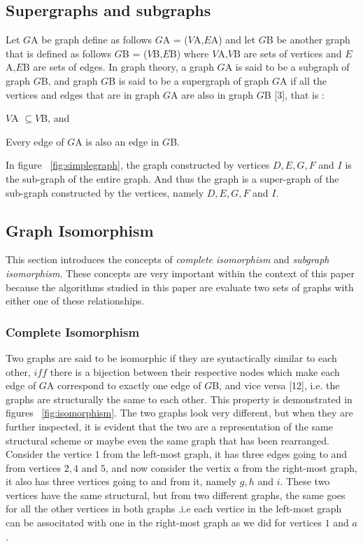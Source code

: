 \subsection{Supergraphs and subgraphs}
Let $G${\tiny A} be graph define as follows $G${\tiny A} = ($V${\tiny A},$E${\tiny A}) and let $G${\tiny B} be another graph that is defined as 
follows $G${\tiny B} = ($V${\tiny B},$E${\tiny B}) where $V${\tiny A},$V${\tiny B} are sets of vertices and $E${\tiny A},$E${\tiny B} are sets of edges.
In graph theory, a graph $G${\tiny A} is said to be a subgraph of graph $G${\tiny B}, and graph $G${\tiny B} is said to be a supergraph of graph 
$G${\tiny A} if all the vertices and edges that are in graph $G${\tiny A} are also in graph $G${\tiny B} [3], that is :

\begin{myEnumerate}
  \item $V${\tiny A} $ \subseteq V${\tiny B}, and
  \item Every edge of $G${\tiny A} is also an edge in $G${\tiny B}.
\end{myEnumerate}

In figure  ~\ref{fig:simplegraph}, the graph constructed by vertices $D,E,G,F$ and $I$ is the sub-graph of the entire graph. And thus the graph is a super-graph of the sub-graph constructed by the vertices, namely $D,E,G,F$ and $I$.

\subsection{Graph Isomorphism}
This section introduces the concepts of \textit{complete isomorphism} and \textit{subgraph isomorphism}. These concepts are very important within the context 
of this paper because the algorithms studied in this paper are evaluate two sets of graphs with either one of these relationships.
\subsubsection{Complete Isomorphism}
Two graphs are said to be isomorphic if they are syntactically similar to each other, $iff$ there is a bijection between their respective nodes which 
make each edge of $G${\tiny A} correspond to exactly one edge of $G${\tiny B}, and vice versa [12], i.e. the graphs are structurally the same to each
other. This property is demonstrated in figures ~\ref{fig:isomorphism}. 
The two graphs look very different, but when they are further inspected, it is evident that the two are a representation of the same structural scheme or maybe even the same graph that has been rearranged. \newline\newline Consider the vertice $1$ from the left-most graph, it has three edges going to and from vertices $2,4$ and $5$, and now consider the vertix $a$ from the right-most graph, it also has three vertices going to and from it, namely $g,h$ and $i$. These two vertices have the same structural, but from two different graphs, the same goes for all the other vertices in both graphs .i.e each vertice in the left-most graph can be associtated with one in the right-most graph as we did for vertices $1$ and $a$.

